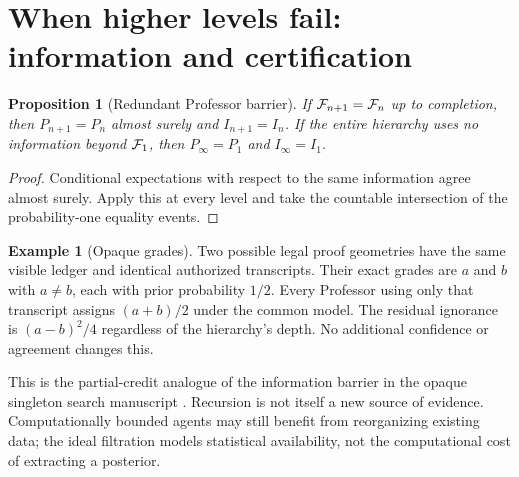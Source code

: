 \documentclass[11pt,letterpaper]{article}
\newtheorem{proposition}[theorem]{Proposition}
\theoremstyle{definition}\newtheorem{definition}[theorem]{Definition}\newtheorem{example}[theorem]{Example}\newtheorem{conjecture}[theorem]{Conjecture}
\begin{document}
\section{When higher levels fail: information and certification}
\begin{proposition}[Redundant Professor barrier]\label{prop:redundant}
If $\mathcal F_{n+1}=\mathcal F_n$ up to completion, then $P_{n+1}=P_n$ almost surely and $I_{n+1}=I_n$. If the entire hierarchy uses no information beyond $\mathcal F_1$, then $P_\infty=P_1$ and $I_\infty=I_1$.
\end{proposition}
\begin{proof}Conditional expectations with respect to the same information agree almost surely. Apply this at every level and take the countable intersection of the probability-one equality events.\end{proof}
\begin{example}[Opaque grades]
Two possible legal proof geometries have the same visible ledger and identical authorized transcripts. Their exact grades are $a$ and $b$ with $a\neq b$, each with prior probability $1/2$. Every Professor using only that transcript assigns $(a+b)/2$ under the common model. The residual ignorance is $(a-b)^2/4$ regardless of the hierarchy's depth. No additional confidence or agreement changes this.
\end{example}
This is the partial-credit analogue of the information barrier in the opaque singleton search manuscript \cite{password}. Recursion is not itself a new source of evidence. Computationally bounded agents may still benefit from reorganizing existing data; the ideal filtration models statistical availability, not the computational cost of extracting a posterior.
\end{document}
